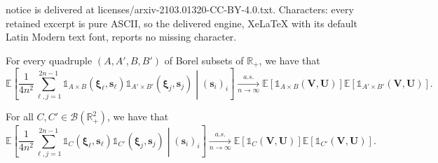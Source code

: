 \documentclass[10pt,a4paper]{amsart}
\def\E{\mathbb{E}}
\def\R{\mathbb{R}}
\begin{document}
notice is delivered at licenses/arxiv-2103.01320-CC-BY-4.0.txt. Characters: every retained excerpt is pure ASCII, so the delivered engine, XeLaTeX with its default Latin Modern text font, reports no missing character.
\begin{lem} \label{lem:first_sec_mom_for_ret}
For every quadruple $(A,A',B,B')$ of Borel subsets of $\R_+$, we have that
\begin{equation}
\E\left[\frac{1}{4n^2}\sum_{\ell,j=1}^{2n-1} \mathds{1}_{A \times B}\left(\bm \xi_\ell,\bm s_\ell\right) \mathds{1}_{A' \times B'}\left(\bm \xi_j,\bm s_j\right)\middle| (\bm s_i)_i\right]\xrightarrow[n\to\infty]{a.s.} \E\left[\mathds{1}_{A \times B}(\bm V,\bm U)\right]\E\left[\mathds{1}_{A' \times B'}(\bm V,\bm U)\right]\label{eq:second_mom_ind_ret}.
\end{equation}
\end{lem}

\begin{lem}\label{lem:ind_fnct}
For all $C,C'\in\mathcal{B}(\R_+^2)$, we have that 
\begin{equation}
\E\left[\frac{1}{4n^2}\sum_{\ell,j=1}^{2n-1}\mathds{1}_{C}\left(\bm \xi_\ell,\bm s_\ell\right)\mathds{1}_{C'}\left(\bm \xi_j,\bm s_j\right)\middle| ( \bm s_i)_i\right]\xrightarrow[n\to\infty]{a.s.} \E\left[\mathds{1}_{C}(\bm V,\bm U)\right]\E\left[\mathds{1}_{C'}(\bm V,\bm U)\right]\label{eq:second_mom_ind_bor}.
\end{equation}
\end{lem}
\end{document}
